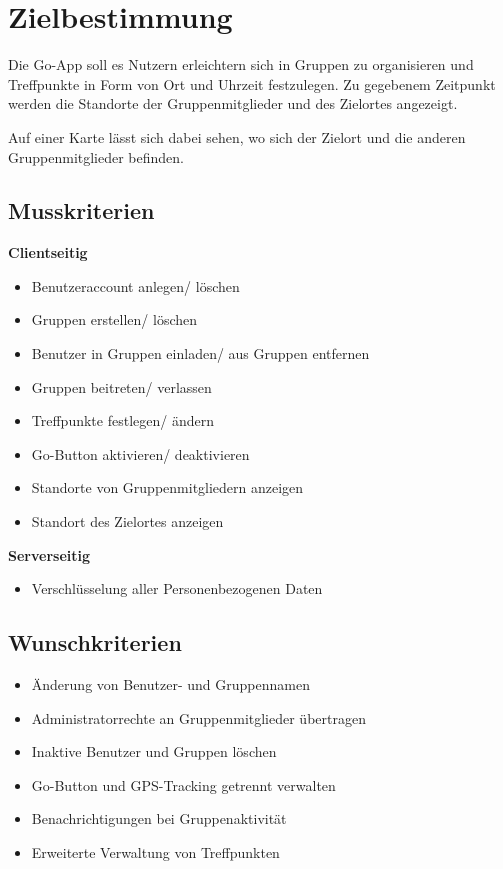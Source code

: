 \section{Zielbestimmung}
Die Go-App soll es Nutzern erleichtern sich in Gruppen zu organisieren
und Treffpunkte in Form von Ort und Uhrzeit festzulegen. Zu gegebenem Zeitpunkt werden die Standorte der Gruppenmitglieder und des Zielortes angezeigt.


Auf einer Karte lässt sich dabei sehen, wo sich der Zielort und die anderen Gruppenmitglieder befinden.

\subsection{Musskriterien}
\textbf{Clientseitig}
\begin{itemize}
	\item Benutzeraccount anlegen/ löschen
	\item Gruppen erstellen/ löschen
	\item Benutzer in Gruppen einladen/ aus Gruppen entfernen
	\item Gruppen beitreten/ verlassen
	\item Treffpunkte festlegen/ ändern
	\item Go-Button aktivieren/ deaktivieren
	\item Standorte von Gruppenmitgliedern anzeigen
	\item Standort des Zielortes anzeigen
\end{itemize}
\textbf{Serverseitig}
\begin{itemize}
	\item Verschlüsselung aller Personenbezogenen Daten	
\end{itemize}

\subsection{Wunschkriterien}
\begin{itemize}
	\item Änderung von Benutzer- und Gruppennamen
	\item Administratorrechte an Gruppenmitglieder übertragen
	\item Inaktive Benutzer und Gruppen löschen
	\item Go-Button und GPS-Tracking getrennt verwalten
	\item Benachrichtigungen bei Gruppenaktivität
	\item Erweiterte Verwaltung von Treffpunkten
\end{itemize}

